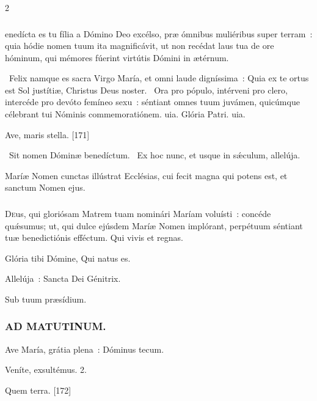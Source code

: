 \documentclass[9pt,twoside]{extarticle}
\begin{document}
\begin{multicols}{2}
{{\subsubsection*{}
enedícta es tu fília a Dómino Deo excélso, præ ómnibus muliéribus super terram~: quia hódie nomen tuum ita magnificávit, ut non recédat laus tua de ore hóminum, qui mémores fúerint virtútis Dómini in ætérnum.

\begin{tightlist}{}
\item {}~Felix namque es sacra Virgo María, et omni laude digníssima~: \textred{*} Quia ex te ortus est Sol justítiæ, Christus Deus noster.
~Ora pro pópulo, intérveni pro clero, intercéde pro devóto femíneo sexu~: séntiant omnes tuum juvámen, quicúmque célebrant tui Nóminis commemoratiónem. uia. Glória Patri. uia.
\item {} Ave, maris stella. [171]
\item {}~Sit nomen Dóminæ benedíctum. ~Ex hoc nunc, et usque in sǽculum, allelúja.
\item {} Maríæ Nomen cunctas illústrat Ecclésias, cui fecit magna qui potens est, et sanctum Nomen ejus.
\end{tightlist}

\subsubsection*{\center {}}
\lettrine{D}eus, qui gloriósam Matrem tuam nominári Maríam voluísti~: concéde quǽsumus; ut, qui dulce ejúsdem Maríæ Nomen implórant, perpétuum séntiant tuæ benedictiónis efféctum. Qui vivis et regnas.

\begin{tightlist}{}
\item {} Glória tibi Dómine, Qui natus es.
\item {} Allelúja~: Sancta Dei Génitrix.
\item {} Sub tuum præsídium.
\end{tightlist}

\subsubsection*{\center \textsc{AD MATUTINUM.}}
\begin{tightlist}{}
\item {} Ave María, grátia plena~: \textred{*} Dóminus tecum.
\item {} Veníte, exsultémus. 2.
\item {} Quem terra. [172]
\end{tightlist}

}}
\end{multicols}
\end{document}
